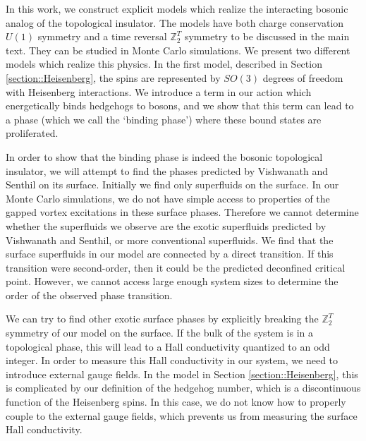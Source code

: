 \documentclass[prb,twocolumn]{revtex4-1}
\def\ztwot{\mathbb{Z}_2^T}
\begin{document}
In this work, we construct explicit models which realize the interacting bosonic analog of the topological insulator. The models have both charge conservation $U(1)$ symmetry and a time reversal $\ztwot$ symmetry to be discussed in the main text. They can be studied in Monte Carlo simulations. 
We present two different models which realize this physics. In the first model, described in Section \ref{section::Heisenberg}, the spins are represented by $SO(3)$ degrees of freedom with Heisenberg interactions. We introduce a term in our action which energetically binds hedgehogs to bosons, and we show that this term can lead to a phase (which we call the `binding phase') where these bound states are proliferated.

In order to show that the binding phase is indeed the bosonic topological insulator, we will attempt to find the phases predicted by Vishwanath and Senthil on its surface. Initially we find only superfluids on the surface. In our Monte Carlo simulations, we do not have simple access to properties of the gapped vortex excitations in these surface phases. Therefore we cannot determine whether the superfluids we observe are the exotic superfluids predicted by Vishwanath and Senthil, or more conventional superfluids. We find that the surface superfluids in our model are connected by a direct transition. If this transition were second-order, then it could be the predicted deconfined critical point. However, we cannot access large enough system sizes to determine the order of the observed phase transition.

We can try to find other exotic surface phases by explicitly breaking the $\ztwot$ symmetry of our model on the surface. If the bulk of the system is in a topological phase, this will lead to a Hall conductivity quantized to an odd integer. In order to measure this Hall conductivity in our system, we need to introduce external gauge fields. In the model in Section \ref{section::Heisenberg}, this is complicated by our definition of the hedgehog number, which is a discontinuous function of the Heisenberg spins. %
In this case, we do not know how to properly couple to the external gauge fields, which prevents us from measuring the surface Hall conductivity.
\end{document}

